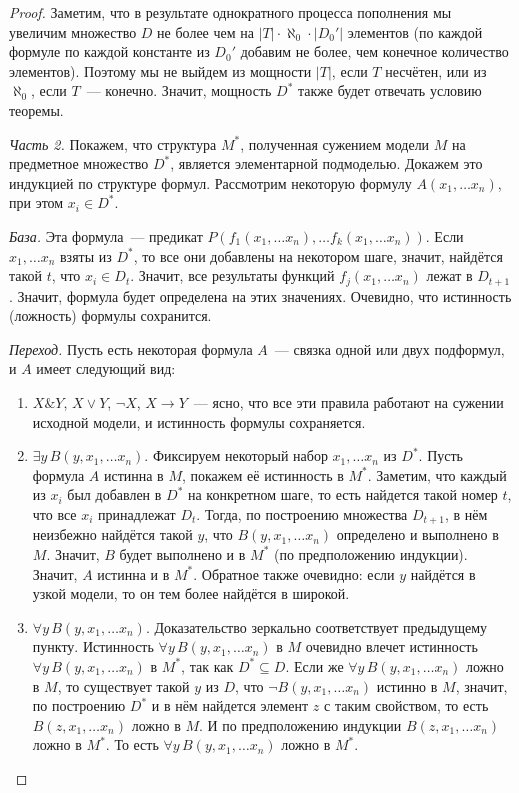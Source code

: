 \documentclass[a4paper,11pt]{article}
\theoremstyle{definition}
\newcommand{\amp}{\mathbin{\&}}
\begin{document}
\begin{proof}
Заметим, что в результате однократного процесса пополнения мы увеличим
множество $D$ не более чем на $|T| \cdot \aleph_0 \cdot |D_0'|$ элементов (по
каждой формуле по каждой константе из $D_0'$ добавим не более, чем конечное
количество элементов). Поэтому мы не выйдем из мощности $|T|$, если $T$
несчётен, или из $\aleph_0$, если $T$~--- конечно. Значит, мощность $D^*$
также будет отвечать условию теоремы.

\emph{Часть 2.} Покажем, что структура $M^*$, полученная сужением модели $M$ на
предметное множество $D^*$, является элементарной подмоделью. Докажем это
индукцией по структуре формул. Рассмотрим некоторую формулу $A(x_1, \dots
x_n)$, при этом $x_i \in D^*$.

\emph{База.} Эта формула~--- предикат $P(f_1(x_1, \dots x_n), \dots f_k(x_1,
\dots x_n))$. Если $x_1, \dots x_n$ взяты из $D^*$, то все они добавлены на
некотором шаге, значит, найдётся такой $t$, что $x_i \in D_t$. Значит, все
результаты функций $f_j(x_1, \dots x_n)$ лежат в $D_{t+1}$. Значит, формула будет
определена на этих значениях. Очевидно, что истинность (ложность) формулы
сохранится.

\emph{Переход.} Пусть есть некоторая формула $A$~--- связка одной или двух
подформул, и $A$ имеет следующий вид:
\begin{enumerate}
\item $X \amp Y$, $X \vee Y$, $\neg X$, $X \to Y$~--- ясно, что все эти правила
  работают на сужении исходной модели, и истинность формулы сохраняется.
\item $\exists y\,B(y, x_1, \dots x_n)$. Фиксируем некоторый набор $x_1, \dots
  x_n$ из $D^*$. Пусть формула $A$ истинна в $M$, покажем её истинность в
  $M^*$. Заметим, что каждый из $x_i$ был добавлен в $D^*$ на конкретном шаге,
  то есть найдется такой номер $t$, что все $x_i$ принадлежат $D_t$. Тогда, по
  построению множества $D_{t+1}$, в нём неизбежно найдётся такой $y$, что $B(y,
  x_1, \dots x_n)$ определено и выполнено в $M$. Значит, $B$ будет выполнено и в
  $M^*$ (по предположению индукции). Значит, $A$ истинна и в $M^*$. Обратное
  также очевидно: если $y$ найдётся в узкой модели, то он тем более найдётся в
  широкой.
\item $\forall y\,B(y, x_1, \dots x_n)$. Доказательство зеркально соответствует
  предыдущему пункту. Истинность $\forall y\,B(y, x_1, \dots x_n)$ в $M$
  очевидно влечет истинность $\forall y\,B(y, x_1, \dots x_n)$ в $M^*$, так как
  $D^* \subseteq D$. Если же $\forall y\,B(y, x_1, \dots x_n)$ ложно в $M$, то
  существует такой $y$ из $D$, что $\neg B(y, x_1, \dots x_n)$ истинно в $M$,
  значит, по построению $D^*$ и в нём найдется элемент $z$ с таким свойством, то
  есть $B(z, x_1, \dots x_n)$ ложно в $M$. И по предположению индукции $B(z,
  x_1, \dots x_n)$ ложно в $M^*$. То есть $\forall y\,B(y, x_1, \dots x_n)$
  ложно в $M^*$.
\end{enumerate}
\end{proof}
\end{document}
